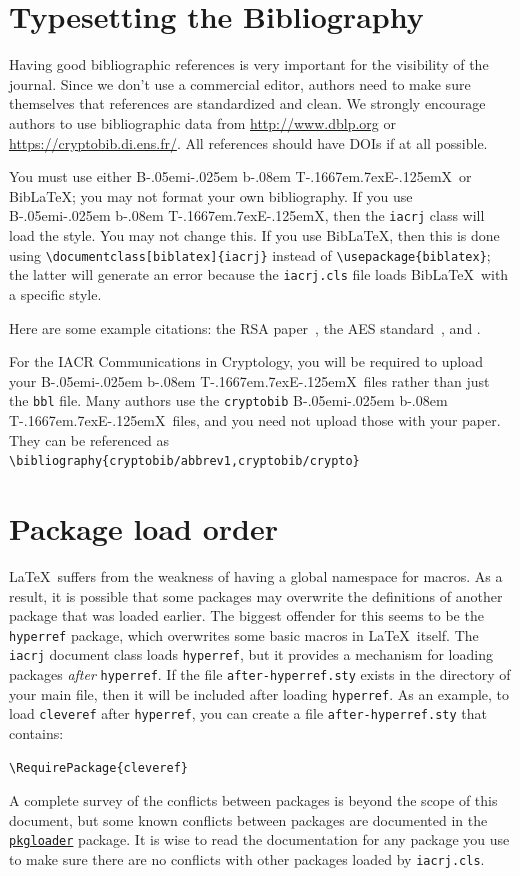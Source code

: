 \documentclass[journal=cic,version=preprint]{iacrj}
\def\BibTeX{{\rm B\kern-.05em{\sc i\kern-.025em b}\kern-.08em
    T\kern-.1667em\lower.7ex\hbox{E}\kern-.125emX}}
\def\BibLaTeX{Bib\LaTeX}
\begin{document}
\section{Typesetting the Bibliography}
\label{sec:biblio}

Having good bibliographic references is very important for the
visibility of the journal.  Since we don't use a commercial editor,
authors need to make sure themselves that references are standardized
and clean.  We strongly encourage authors to use bibliographic data
from \url{http://www.dblp.org} or \url{https://cryptobib.di.ens.fr/}.
All references should have DOIs if at all possible.

You must use either \BibTeX\ or \BibLaTeX; you may not format your own bibliography.
If you use \BibTeX, then the \texttt{iacrj} class will load the
\verb++ style.  You may not change
this. If you use \BibLaTeX, then this is done using
\verb+\documentclass[biblatex]{iacrj}+ instead of
\verb+\usepackage{biblatex}+; the latter will generate an error
because the \texttt{iacrj.cls} file loads \BibLaTeX\ with a
specific style.

Here are some example citations: the RSA paper~\cite{RSA78}, the AES
standard~\cite{AES-FIPS}, and \cite{DBLP:conf/crypto/Kocher96}.

For the IACR Communications in Cryptology, you will be required to
upload your \BibTeX\ files rather than just the \texttt{bbl} file.
Many authors use the \texttt{cryptobib} \BibTeX\ files, and you need
not upload those with your paper. They can be referenced as
\texttt{\textbackslash bibliography\{cryptobib/abbrev1,cryptobib/crypto\}}

\section{Package load order}\label{sec:loadorder}

\LaTeX\ suffers from the weakness of having a global namespace for
macros. As a result, it is possible that some packages may overwrite
the definitions of another package that was loaded earlier. The
biggest offender for this seems to be the \texttt{hyperref} package,
which overwrites some basic macros in \LaTeX\ itself. The
\texttt{iacrj} document class loads \texttt{hyperref}, but it
provides a mechanism for loading packages \emph{after} \texttt{hyperref}. If
the file \texttt{after-hyperref.sty} exists in the directory of your
main file, then it will be included after loading \texttt{hyperref}.
As an example, to load \texttt{cleveref} after \texttt{hyperref}, you
can create a file \texttt{after-hyperref.sty} that contains:
\begin{verbatim}
\RequirePackage{cleveref}
\end{verbatim}
A complete survey of the conflicts between packages is beyond the scope of this document, but
some known conflicts between packages are documented in the
\href{https://github.com/mhelvens/latex-pkgloader/blob/master/pkgloader-recommended.sty}{\texttt{pkgloader}}
package. It is wise to read the documentation for any package you use to make sure
there are no conflicts with other packages loaded by \texttt{iacrj.cls}.
\end{document}
